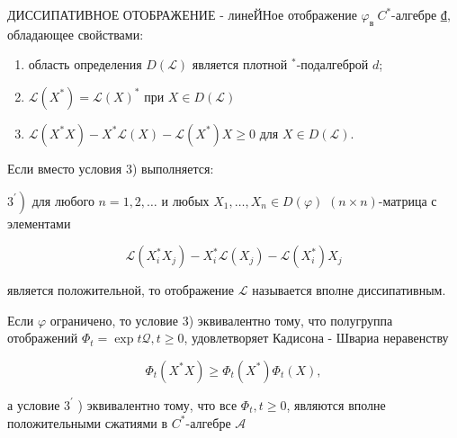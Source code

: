 \documentclass[10pt]{article}
\begin{document}
ДИССИПАТИВНОЕ ОТОБРАЖЕНИЕ - линеЙНое отображение $\varphi_{\text {в }} C^{*}$-алгебре $₫$, обладающее свойствами:



\begin{enumerate}

  \item область определения $D(\mathscr{L})$ является плотной ${ }^{*}$-подалгеброй $d$;



  \item $\mathscr{L}\left(X^{*}\right)=\mathscr{L}(X)^{*}$ при $X \in D(\mathscr{L})$



  \item $\mathscr{L}\left(X^{*} X\right)-X^{*} \mathscr{L}(X)-\mathscr{L}\left(X^{*}\right) X \geqslant 0$ для $X \in D(\mathscr{L})$.



\end{enumerate}



Если вместо условия 3) выполняется:



$\left.3^{\prime}\right)$ для любого $n=1,2, \ldots$ и любых $X_{1}, \ldots, X_{n} \in D(\varphi)$ $(n \times n)$-матрица с элементами



\[

\mathscr{L}\left(X_{i}^{*} X_{j}\right)-X_{i}^{*} \mathscr{L}\left(X_{j}\right)-\mathscr{L}\left(X_{i}^{*}\right) X_{j}

\]



является положительной, то отображение $\mathscr{L}$ называется вполне диссипативным.



Если $\mathscr{\varphi}$ ограничено, то условие 3) эквивалентно тому, что полугруппа отображений $\Phi_{t}=\exp t \mathscr{Q}, t \geqslant 0$, удовлетворяет Кадисона - Швариа неравенству



\[

\Phi_{t}\left(X^{*} X\right) \geqslant \Phi_{t}\left(X^{*}\right) \Phi_{t}(X),

\]



а условие $3^{\prime}$ ) эквивалентно тому, что все $\Phi_{t}, t \geqslant 0$, являются вполне положительными сжатиями в $C^{*}$-алгебре $\mathscr{A}$
\end{document}
